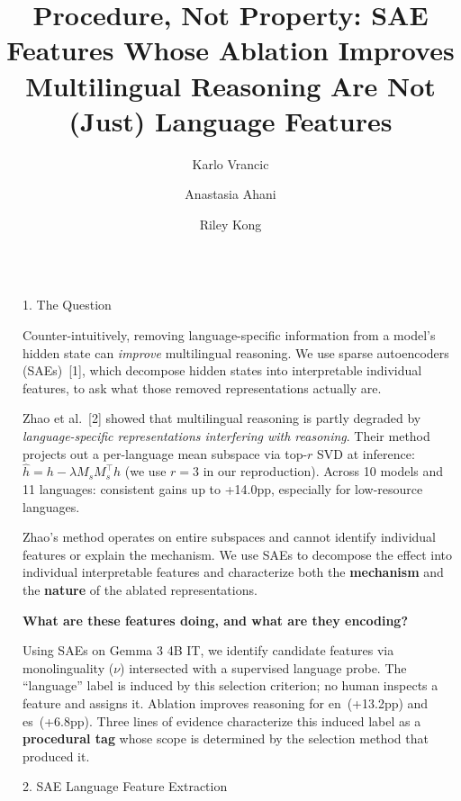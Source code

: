 \documentclass[final]{beamer}
\title{\textbf{Procedure, Not Property:} SAE Features Whose Ablation Improves
  Multilingual Reasoning Are Not (Just) Language Features}
\author{Karlo Vrancic \and Anastasia Ahani \and Riley Kong}
\institute{MIT 6.8610: Quantitative Methods for Natural Language Processing, Spring 2026}
\newlength{\sepwidth}
\newlength{\colwidth}
\newcommand{\separatorcolumn}{\begin{column}{\sepwidth}\end{column}}
\begin{document}
\begin{frame}[t]
\begin{columns}[t]
\separatorcolumn

\begin{column}{\colwidth}

  \begin{block}{1. The Question}

    Counter-intuitively, removing language-specific information from a
    model's hidden state can \emph{improve} multilingual reasoning. We use
    sparse autoencoders (SAEs)~[1], which decompose hidden
    states into interpretable individual features, to ask what those removed
    representations actually are.

    Zhao et al.~[2] showed that multilingual reasoning is partly degraded
    by \emph{language-specific representations interfering with reasoning}.
    Their method projects out a per-language mean subspace via top-$r$ SVD
    at inference: $\hat{h} = h - \lambda M_s M_s^\top h$ (we use $r{=}3$ in
    our reproduction). Across 10 models and 11 languages: consistent gains
    up to +14.0pp, especially for low-resource languages.

    Zhao's method operates on entire subspaces and cannot identify individual
    features or explain the mechanism. We use SAEs to decompose the effect
    into individual interpretable features and characterize both the
    \textbf{mechanism} and the \textbf{nature} of the ablated
    representations.

    \textbf{What are these features doing, and what are they encoding?}

    Using SAEs on Gemma 3 4B IT, we identify candidate features via
    monolinguality ($\nu$) intersected with a supervised language probe.
    The ``language'' label is induced by this selection criterion; no
    human inspects a feature and assigns it.
    Ablation improves reasoning for en~(+13.2pp) and es~(+6.8pp). Three
    lines of evidence characterize this induced label as a
    \textbf{procedural tag} whose scope is determined by the selection
    method that produced it.

  \end{block}

  \begin{block}{2. SAE Language Feature Extraction}


\end{block}
\end{column}
\end{columns}
\end{frame}
\end{document}
